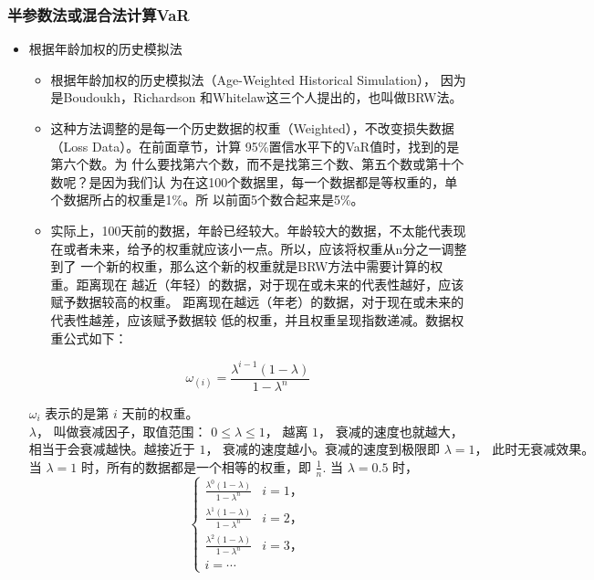 \subsubsection{半参数法或混合法计算VaR}
\begin{itemize}
    \item 根据年龄加权的历史模拟法
    
    \begin{itemize}
            
        \item 根据年龄加权的历史模拟法（Age-Weighted Historical Simulation）， 因为是Boudoukh，Richardson 和Whitelaw这三个人提出的，也叫做BRW法。

\item 这种方法调整的是每一个历史数据的权重（Weighted），不改变损失数据（Loss
Data）。在前面章节，计算 95\%置信水平下的VaR值时，找到的是第六个数。为
什么要找第六个数，而不是找第三个数、第五个数或第十个数呢？是因为我们认
为在这100个数据里，每一个数据都是等权重的，单个数据所占的权重是1\%。所
以前面5个数合起来是5\%。

\item 实际上，100天前的数据，年龄已经较大。年龄较大的数据，不太能代表现
在或者未来，给予的权重就应该小一点。所以，应该将权重从n分之一调整到了
一个新的权重，那么这个新的权重就是BRW方法中需要计算的权重。距离现在
越近（年轻）的数据，对于现在或未来的代表性越好，应该赋予数据较高的权重。
距离现在越远（年老）的数据，对于现在或未来的代表性越差，应该赋予数据较
低的权重，并且权重呈现指数递减。数据权重公式如下：
\end{itemize}

\[\omega_{(i)}=\frac{\lambda ^{i-1}(1-\lambda)}{1-\lambda^n}\]



\(
\omega_i \text{ 表示的是第 } i \text{ 天前的权重。}
\)
\(
\lambda， \text{ 叫做衰减因子，取值范围： } 0 \leq \lambda \leq 1， \text{ 越离 } 1， \text{ 衰减的速度也就越大，}
\)
\(
\text{相当于会衰减越快。越接近于 } 1， \text{ 衰减的速度越小。衰减的速度到极限即 } \lambda=1， \text{ 此时无衰减效果。}
\)
\(
\text{当 } \lambda=1 \text{ 时，所有的数据都是一个相等的权重，即 } \frac{1}{n}.
\)
\(
\text{当 } \lambda=0.5 \text{ 时，}
\)
\[
\begin{cases}
\frac{\lambda^0(1-\lambda)}{1-\lambda^n} & i=1， \\
\frac{\lambda^1(1-\lambda)}{1-\lambda^n} & i=2， \\
\frac{\lambda^2(1-\lambda)}{1-\lambda^n} & i=3， \\
i=\cdots &
\end{cases}
\]



\end{itemize}
